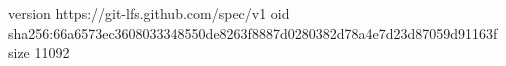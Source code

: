 version https://git-lfs.github.com/spec/v1
oid sha256:66a6573ec3608033348550de8263f8887d0280382d78a4e7d23d87059d91163f
size 11092
